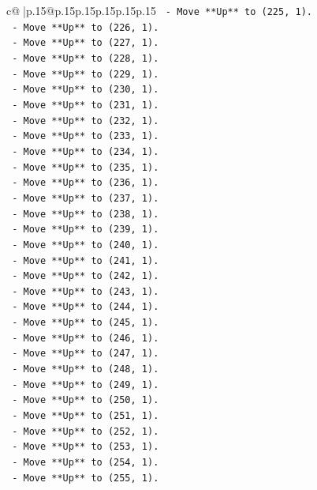 \documentclass{article}
\begin{document}
{\begin{supertabular}{c@{$\;$}|p{.15\linewidth}@{}p{.15\linewidth}p{.15\linewidth}p{.15\linewidth}p{.15\linewidth}p{.15\linewidth}}
{{{\texttt{    {-} Move **Up** to (225, 1).} \\
\texttt{    {-} Move **Up** to (226, 1).} \\
\texttt{    {-} Move **Up** to (227, 1).} \\
\texttt{    {-} Move **Up** to (228, 1).} \\
\texttt{    {-} Move **Up** to (229, 1).} \\
\texttt{    {-} Move **Up** to (230, 1).} \\
\texttt{    {-} Move **Up** to (231, 1).} \\
\texttt{    {-} Move **Up** to (232, 1).} \\
\texttt{    {-} Move **Up** to (233, 1).} \\
\texttt{    {-} Move **Up** to (234, 1).} \\
\texttt{    {-} Move **Up** to (235, 1).} \\
\texttt{    {-} Move **Up** to (236, 1).} \\
\texttt{    {-} Move **Up** to (237, 1).} \\
\texttt{    {-} Move **Up** to (238, 1).} \\
\texttt{    {-} Move **Up** to (239, 1).} \\
\texttt{    {-} Move **Up** to (240, 1).} \\
\texttt{    {-} Move **Up** to (241, 1).} \\
\texttt{    {-} Move **Up** to (242, 1).} \\
\texttt{    {-} Move **Up** to (243, 1).} \\
\texttt{    {-} Move **Up** to (244, 1).} \\
\texttt{    {-} Move **Up** to (245, 1).} \\
\texttt{    {-} Move **Up** to (246, 1).} \\
\texttt{    {-} Move **Up** to (247, 1).} \\
\texttt{    {-} Move **Up** to (248, 1).} \\
\texttt{    {-} Move **Up** to (249, 1).} \\
\texttt{    {-} Move **Up** to (250, 1).} \\
\texttt{    {-} Move **Up** to (251, 1).} \\
\texttt{    {-} Move **Up** to (252, 1).} \\
\texttt{    {-} Move **Up** to (253, 1).} \\
\texttt{    {-} Move **Up** to (254, 1).} \\
\texttt{    {-} Move **Up** to (255, 1).} \\
}}}
\end{supertabular}}
\end{document}
